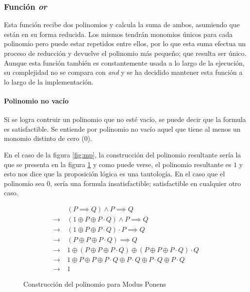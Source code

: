 \subsubsection{Función \textit{or}}

Esta función recibe dos polinomios y calcula la suma de ambos, asumiendo que están en su forma reducida. Los mismos tendrán monomios únicos para cada polinomio pero puede estar repetidos entre ellos, por lo que esta suma efectua un proceso de reducción y devuelve el polinomio más pequeño; que resulta ser único. Aunque esta función también es constantemente usada a lo largo de la ejecución, su complejidad no se compara con \textit{and} y se ha decidido mantener esta función a lo largo de la implementación.

\paragraph{Polinomio no vacío}

Si se logra contruir un polinomio que no esté vacío, se puede decir que la formula es satisfactible. Se entiende por polinomio no vacío aquel que tiene al menos un monomio distinto de cero ($0$).

En el caso de la figura \ref{fig:mp}, la construcción del polinomio resultante sería la que se presenta en la figura \ref{fig:mp_anf} y como puede verse, el polinomio resultante es $1$ y esto nos dice que la proposición lógica es una tautología. En el caso que el polinomio sea $0$, sería una formula insatisfactible; satisfactible en cualquier otro caso.

\begin{figure}
\begin{align*}
                 & (P\implies Q)\land P \implies Q\\
    \rightarrow\ & (1 \oplus P \oplus P\cdot Q)\land P \implies Q\\
    \rightarrow\ & (1 \oplus P \oplus P\cdot Q)\cdot P \implies Q\\
    \rightarrow\ & (P \oplus P \oplus P\cdot Q) \implies Q\\
    \rightarrow\ & 1 \oplus (P \oplus P \oplus P\cdot Q) \oplus (P \oplus P \oplus P\cdot Q)\cdot Q\\
    \rightarrow\ & 1 \oplus P \oplus P \oplus P\cdot Q \oplus P\cdot Q\oplus P\cdot Q \oplus P\cdot Q \\
    \rightarrow\ & 1
\end{align*}
\caption{Construcción del polinomio para Modus Ponens}
\label{fig:mp_anf}
\end{figure}

